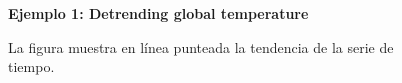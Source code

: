 
\begin{figure}[H]
	\centering
	\textbf{Ejemplo 1: Detrending global temperature}\par\medskip
	\caption{La figura muestra en línea punteada la tendencia de la serie de tiempo.}\label{fig1}
\end{figure}


